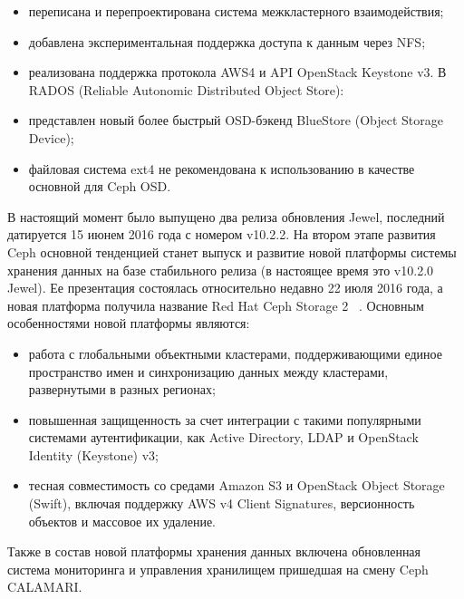 \documentclass[10pt, a5paper]{article}
\begin{document}
\begin{itemize}
  \item переписана и перепроектирована система межкластерного взаимодействия;
  \item добавлена экспериментальная поддержка доступа к данным через NFS;
  \item реализована поддержка протокола AWS4 и API OpenStack Keystone v3.
В RADOS (Reliable Autonomic Distributed Object Store):
  \item представлен новый более быстрый OSD-бэкенд BlueStore \linebreak (Object Storage Device);
  \item файловая система ext4 не рекомендована к использованию в качестве основной для Ceph OSD.
\end{itemize}

В настоящий момент было выпущено два релиза обновления Jewel, последний датируется 15 июнем 2016 года с номером  v10.2.2.
На втором этапе развития Ceph основной тенденцией станет выпуск и развитие новой платформы системы хранения данных на базе стабильного релиза (в настоящее время это v10.2.0 Jewel). Ее презентация состоялась относительно недавно 22 июля 2016 года, а новая платформа получила название Red Hat Ceph Storage 2 ~\cite{Kliga6}. Основным особенностями новой платформы являются:

\begin{itemize}
  \item работа с глобальными объектными кластерами, поддерживающими единое пространство имен и синхронизацию данных между кластерами, развернутыми в разных регионах;
  \item повышенная защищенность за счет интеграции с такими популярными системами аутентификации, как Active Directory, LDAP и OpenStack Identity (Keystone) v3;
  \item тесная совместимость со средами Amazon S3 и OpenStack \linebreak Object Storage (Swift), включая поддержку AWS v4 Client Signatures, версионность объектов и массовое их удаление.
\end{itemize}

Также в состав новой платформы хранения данных включена обновленная система мониторинга и управления хранилищем пришедшая на смену Ceph CALAMARI.
\end{document}
